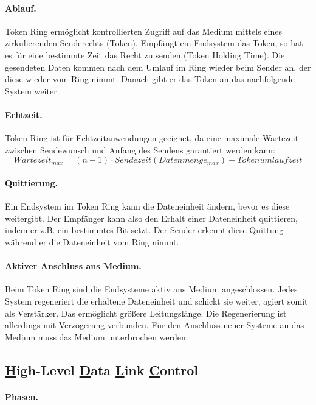 \documentclass[]{scrartcl}
\begin{document}
\paragraph{Ablauf.}Token Ring erm\"oglicht kontrollierten Zugriff auf das Medium mittels eines zirkulierenden Senderechts (Token). Empf\"angt ein Endsystem das Token, so hat es f\"ur eine bestimmte Zeit das Recht zu senden (Token Holding Time). Die gesendeten Daten kommen nach dem Umlauf im Ring wieder beim Sender an, der diese wieder vom Ring nimmt. Danach gibt er das Token an das nachfolgende System weiter.

\paragraph{Echtzeit.} Token Ring ist f\"ur Echtzeitanwendungen geeignet, da eine maximale Wartezeit  zwischen Sendewunsch und Anfang des Sendens garantiert werden kann:
$$Wartezeit_{max} = (n-1) \cdot Sendezeit(Datenmenge_{max}) + Tokenumlaufzeit$$

\paragraph{Quittierung.} Ein Endsystem im Token Ring kann die Dateneinheit \"andern, bevor es diese weitergibt. Der Empf\"anger kann also den Erhalt einer Dateneinheit quittieren, indem er z.B. ein bestimmtes Bit setzt. Der Sender erkennt diese Quittung w\"ahrend er die Dateneinheit vom Ring nimmt.

\paragraph{Aktiver Anschluss ans Medium.} Beim Token Ring sind die Endsysteme aktiv ans Medium angeschlossen. Jedes System regeneriert die erhaltene Dateneinheit und schickt sie weiter, agiert somit als Verst\"arker. Das erm\"oglicht gr\"o{\ss}ere Leitungsl\"ange. Die Regenerierung ist allerdings mit Verz\"ogerung verbunden. F\"ur den Anschluss neuer Systeme an das Medium muss das Medium unterbrochen werden.





\subsection{\underline{H}igh-Level \underline{D}ata \underline{L}ink \underline{C}ontrol}


\paragraph{Phasen.}
\end{document}
